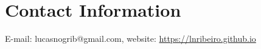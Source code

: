 \section{Contact Information}
E-mail: lucasnogrib@gmail.com, website: \url{https://lnribeiro.github.io}
